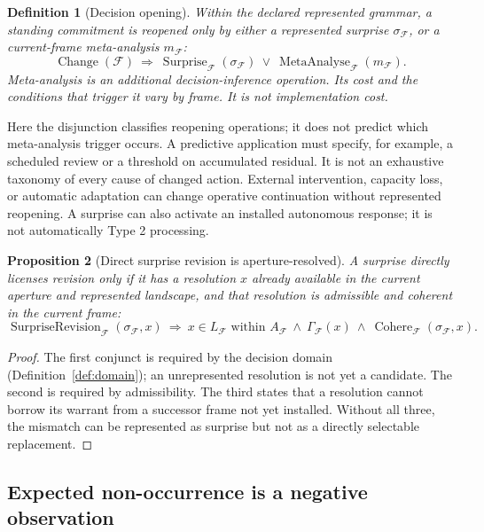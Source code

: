 \documentclass[11pt,a4paper]{article}
\newtheorem{definition}{Definition}[section]
\newtheorem{proposition}[definition]{Proposition}
\theoremstyle{remark}
\newcommand{\Frame}{\mathcal F}
\newcommand{\Meta}{\operatorname{MetaAnalyse}}
\newcommand{\Cohere}{\operatorname{Cohere}}
\newcommand{\Surprise}{\operatorname{Surprise}}
\begin{document}
\begin{definition}[Decision opening]\label{def:opening}
Within the declared represented grammar, a standing commitment is reopened
only by either a represented surprise
\(\sigma_{\Frame}\), or a current-frame meta-analysis \(m_{\Frame}\):
\[
\operatorname{Change}(\Frame)\ \Longrightarrow\
\Surprise_{\Frame}(\sigma_{\Frame})\ \lor\ \Meta_{\Frame}(m_{\Frame}).
\]
Meta-analysis is an additional decision-inference operation. Its cost and the
conditions that trigger it vary by frame. It is not implementation cost.
\end{definition}
Here the disjunction classifies reopening operations; it does not predict
which meta-analysis trigger occurs. A predictive application must specify,
for example, a scheduled review or a threshold on accumulated residual.
It is not an exhaustive taxonomy of every cause of changed action. External
intervention, capacity loss, or automatic adaptation can change operative
continuation without represented reopening. A surprise can also activate an
installed autonomous response; it is not automatically Type 2 processing.



\begin{proposition}[Direct surprise revision is aperture-resolved]\label{prop:surprise-resolution}
A surprise directly licenses revision only if it has a resolution \(x\) already
available in the current aperture and represented landscape, and that resolution
is admissible and coherent in the current frame:
\[
\operatorname{SurpriseRevision}_{\Frame}(\sigma_{\Frame},x)
\ \Longrightarrow\
x\in L_{\Frame}\text{ within }A_{\Frame}
\ \land\ \Gamma_{\Frame}(x)
\ \land\ \Cohere_{\Frame}(\sigma_{\Frame},x).
\]
\end{proposition}

\begin{proof}
The first conjunct is required by the decision domain
(Definition~\ref{def:domain}); an unrepresented resolution is not yet a
candidate. The second is required by admissibility. The third states that a
resolution cannot borrow its warrant from a successor frame not yet installed.
Without all three, the mismatch can be represented as surprise but not as a
directly selectable replacement. \end{proof}

\subsection{Expected non-occurrence is a negative observation}\label{sec:nonoccurrence}
\end{document}

